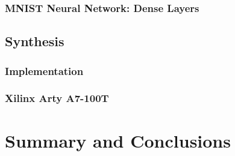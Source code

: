 \documentclass[a4paper,8pt]{report}
\begin{document}
\subsection{}



\subsection{MNIST Neural Network: Dense Layers}

\section{Synthesis}
\subsection{Implementation}
\subsection{Xilinx Arty A7-100T}

\chapter{Summary and Conclusions} 




\appendix
\singlespacing

 
%  

\end{document}
